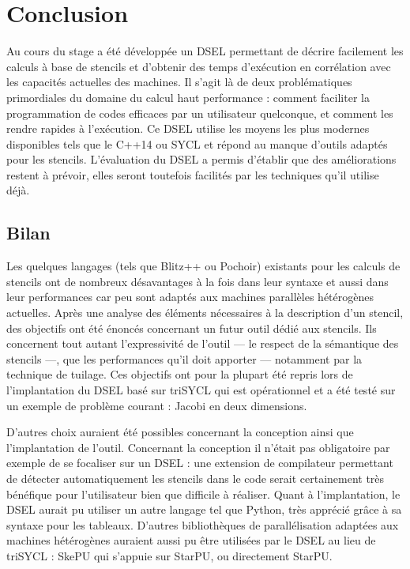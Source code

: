 
\chapter{Conclusion}

Au cours du stage a été développée un DSEL permettant de décrire facilement les calculs à base de stencils et d'obtenir des temps d'exécution en corrélation avec les capacités actuelles des machines. Il s'agit là de deux problématiques primordiales du domaine du calcul haut performance : comment faciliter la programmation de codes efficaces par un utilisateur quelconque, et comment les rendre rapides à l'exécution. Ce DSEL utilise les moyens les plus modernes disponibles tels que le \textsf{C++14} ou \textsf{SYCL} et répond au manque d'outils adaptés pour les stencils. L'évaluation du DSEL a permis d'établir que des améliorations restent à prévoir, elles seront toutefois facilités par les techniques qu'il utilise déjà. 

\section{Bilan}

Les quelques langages (tels que \textsf{Blitz++} ou \textsf{Pochoir}) existants pour les calculs de stencils ont de nombreux désavantages à la fois dans leur syntaxe et aussi dans leur performances car peu sont adaptés aux machines parallèles hétérogènes actuelles. Après une analyse des éléments nécessaires à la description d'un stencil, des objectifs ont été énoncés concernant un futur outil dédié aux stencils. Ils concernent tout autant l'expressivité de l'outil --- le respect de la sémantique des stencils ---, que les performances qu'il doit apporter --- notamment par la technique de tuilage. Ces objectifs ont pour la plupart été repris lors de l'implantation du DSEL basé sur \textsf{triSYCL} qui est opérationnel et a été testé sur un exemple de problème courant : Jacobi en deux dimensions. 

D'autres choix auraient été possibles concernant la conception ainsi que l'implantation de l'outil. Concernant la conception il n'était pas obligatoire par exemple de se focaliser sur un DSEL : une extension de compilateur permettant de détecter automatiquement les stencils dans le code serait certainement très bénéfique pour l'utilisateur bien que difficile à réaliser. Quant à l'implantation, le DSEL aurait pu utiliser un autre langage tel que \textsf{Python}, très apprécié grâce à sa syntaxe pour les tableaux. D'autres bibliothèques de parallélisation adaptées aux machines hétérogènes auraient aussi pu être utilisées par le DSEL au lieu de \textsf{triSYCL} : \textsf{SkePU} qui s'appuie sur \textsf{StarPU}, ou directement \textsf{StarPU}.

